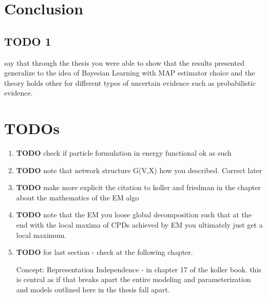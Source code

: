 \documentclass[11pt]{article}
\begin{document}
\begin{article}
\begin{algorithm*}[h!]
\begin{multicols}{2}
\begin{algorithmic}[1]
{\EndWhile
\EndProcedure

\end{algorithmic}
\end{multicols}
\end{algorithm*}

\newpage

\section{Conclusion}
\label{conclusion}
\subsection{{\bfseries\sffamily TODO} 1}
\label{sec:org9e94867}

say that through the thesis you were able to show that the results
presented generalize to the idea of Bayesian Learning with MAP
estimator choice and the theory holds other for different types of
uncertain evidence such as probabilistic evidence. 

\newpage   


\section{TODOs}
\label{sec:org865be9c}

\begin{enumerate}
\item {\bfseries\sffamily TODO} check if particle formulation in energy functional ok as such
\label{sec:org00efd7f}
\item {\bfseries\sffamily TODO} note that network structure G(V,X) how you described. Correct later
\label{sec:orgb21b25a}
\item {\bfseries\sffamily TODO} make more explicit the citation to koller and friedman in the chapter about the mathematics of the EM algo
\label{sec:org7ce7b00}
\item {\bfseries\sffamily TODO} note that the EM you loose global decomposition such that at the end with the local maxima of CPDs achieved by EM you ultimately just get a local maximum.
\label{sec:orgd323c85}
\item {\bfseries\sffamily TODO} for last section - check at the following chapter.
\label{sec:org77f86e8}

Concept: Representation Independence - in chapter 17 of the
koller book. this is central as if that breaks apart the entire
modeling and parameterization and models outlined here in the
thesis fall apart.


\end{enumerate}
\end{article}
\end{document}
